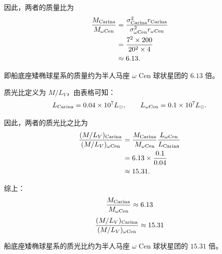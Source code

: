 \documentclass{ctexart}
\begin{document}
因此，两者的质量比为
\[
\begin{aligned}
\frac{M_{\rm Carina}}{M_{\omega\rm Cen}}
&=
\frac{\sigma_{\rm Carina}^2 r_{\rm Carina}}
{\sigma_{\omega\rm Cen}^2 r_{\omega\rm Cen}}\\
&=\frac{7^2\times 200}{20^2\times 4}\\
&\approx 6.13.
\end{aligned}
\]

即船底座矮椭球星系的质量约为半人马座
$\omega$ Cen 球状星团的 $6.13$ 倍。

质光比定义为 $M/L_V$，由表格可知：
\[
L_{\rm Carina}=0.04\times10^7L_\odot,
\qquad
L_{\omega\rm Cen}=0.1\times10^7L_\odot.
\]

因此，两者的质光比之比为
\[
\begin{aligned}
\frac{(M/L_V)_{\rm Carina}}
{(M/L_V)_{\omega\rm Cen}}
&=
\frac{M_{\rm Carina}}{M_{\omega\rm Cen}}
\frac{L_{\omega\rm Cen}}{L_{\rm Carina}}\\
&=6.13\times\frac{0.1}{0.04}\\
&\approx 15.31.
\end{aligned}
\]

综上：
\[
\frac{M_{\rm Carina}}{M_{\omega\rm Cen}}
\approx 6.13
\]
\[
\frac{(M/L_V)_{\rm Carina}}
{(M/L_V)_{\omega\rm Cen}}
\approx 15.31
\]

船底座矮椭球星系的质光比约为半人马座
$\omega$ Cen 球状星团的 $15.31$ 倍。
\end{document}
